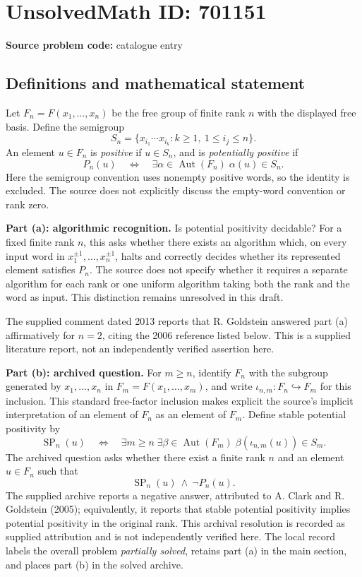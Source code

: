 \documentclass[11pt]{article}
\begin{document}
\section*{UnsolvedMath ID: 701151}
\textbf{Source problem code:} catalogue entry
\subsection{Definitions and mathematical statement}
Let \(F_n=F(x_1,\ldots,x_n)\) be the free group of finite rank \(n\) with the displayed free basis. Define the semigroup
\[
S_n=\{x_{i_1}\cdots x_{i_k}:k\geq 1,\ 1\leq i_j\leq n\}.
\]
An element \(u\in F_n\) is \emph{positive} if \(u\in S_n\), and is \emph{potentially positive} if
\[
P_n(u)\quad\Longleftrightarrow\quad
\exists\alpha\in\operatorname{Aut}(F_n)\;\alpha(u)\in S_n.
\]
Here the semigroup convention uses nonempty positive words, so the identity is excluded. The source does not explicitly discuss the empty-word convention or rank zero.

\textbf{Part (a): algorithmic recognition.} Is potential positivity decidable? For a fixed finite rank \(n\), this asks whether there exists an algorithm which, on every input word in \(x_1^{\pm1},\ldots,x_n^{\pm1}\), halts and correctly decides whether its represented element satisfies \(P_n\). The source does not specify whether it requires a separate algorithm for each rank or one uniform algorithm taking both the rank and the word as input. This distinction remains unresolved in this draft.

The supplied comment dated 2013 reports that R. Goldstein answered part (a) affirmatively for \(n=2\), citing the 2006 reference listed below. This is a supplied literature report, not an independently verified assertion here.

\textbf{Part (b): archived question.} For \(m\geq n\), identify \(F_n\) with the subgroup generated by \(x_1,\ldots,x_n\) in \(F_m=F(x_1,\ldots,x_m)\), and write \(\iota_{n,m}:F_n\hookrightarrow F_m\) for this inclusion. This standard free-factor inclusion makes explicit the source's implicit interpretation of an element of \(F_n\) as an element of \(F_m\). Define stable potential positivity by
\[
\operatorname{SP}_n(u)\quad\Longleftrightarrow\quad
\exists m\geq n\;\exists\beta\in\operatorname{Aut}(F_m)\;
\beta(\iota_{n,m}(u))\in S_m.
\]
The archived question asks whether there exist a finite rank \(n\) and an element \(u\in F_n\) such that
\[
\operatorname{SP}_n(u)\ \land\ \neg P_n(u).
\]
The supplied archive reports a negative answer, attributed to A. Clark and R. Goldstein (2005); equivalently, it reports that stable potential positivity implies potential positivity in the original rank. This archival resolution is recorded as supplied attribution and is not independently verified here. The local record labels the overall problem \emph{partially solved}, retains part (a) in the main section, and places part (b) in the solved archive.
\end{document}
